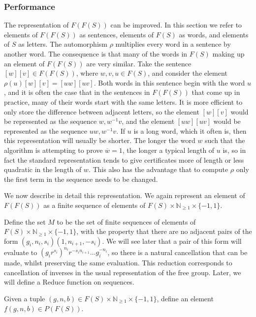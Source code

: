 \documentclass[12pt]{article} %
\theoremstyle{definition}
\theoremstyle{definition}
\theoremstyle{definition}
\theoremstyle{definition}
\begin{document}
\subsubsection{Performance}

The representation of $F(F(S))$ can be improved. In this section
we refer to elements of $F(F(S))$ as sentences, elements of $F(S)$ as words,
and elements of $S$ as letters.
 The automorphism $\rho$ multiplies
every word in a sentence by another word. The consequence is that many of the words in
$F(S)$ making up an element of $F(F(S))$ are very similar. Take the sentence $[w][v] \in F(F(S))$,
where $w, v, u \in F(S)$, and consider the element $\rho(u)[w][v] = [uw][uv]$. Both words
in this sentence begin with the word $u$, and it is often the case that in the sentences in $F(F(S))$
that come up in practice, many of their words start with the same letters.
It is more efficient to only store the difference between adjacent letters, so the
element $[w][v]$ would be represented as the sequence $w, w^{-1}v$, and
the element $[uw][uv]$ would be represented as the sequence $uw, w^{-1}v$.
If $u$ is a long word, which it often is, then this representation will usually be shorter.
The longer the word $w$ such that the algorithm is attempting
to prove $\overline{w} = 1$, the longer a typical length of $u$ is, so in fact
the standard representation tends to give certificates more of length or less quadratic in
the length of $w$.
This also has the advantage that to compute $\rho$ only the first term in the sequence needs
to be changed.

We now describe in detail this representation. We again
represent an element of $F(F(S))$ as a finite sequence of elements of $F(S) \times \mathbb{N}_{\ge 1}
\times\{-1,1\}$.

Define the set $M$ to be the set of finite sequences of elements of
$F(S) \times \mathbb{N}_{\ge 1}
\times\{-1,1\}$, with the property that there are no adjacent pairs of the form
$(g_i, n_i, s_i)(1, n_{i+1}, -s_i)$. We will see later that a pair of this form will evaluate
to $(g_i r^{s_i})^{n_i}r^{-s_in_{i+1}} \dots g_i^{-n_i}$,
so there is a natural cancellation that can be made, whilst preserving the same
evaluation. This reduction corresponds to cancellation of inverses in
the usual representation of the free group. Later,
we will define a Reduce function on sequences.

Given a tuple $(g, n, b) \in F(S) \times \mathbb{N}_{\ge 1} \times\{-1,1\}$,
define an element $f(g, n, b) \in P(F(S))$.
\end{document}
